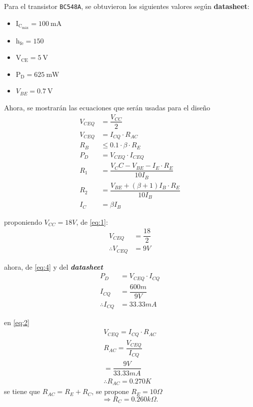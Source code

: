\documentclass[a4paper, 12pt]{article}
\begin{document}
Para el transistor \verb|BC548A|, se obtuvieron los siguientes valores según \textbf{datasheet}:
\begin{itemize}
    \item $\text{I}_{\text{C}_{\text{máx}}} = 100\ \text{mA}$
    \item $\text{h}_{\text{fe}} = 150$
    \item $\text{V}_{\text{CE}} = 5\ \text{V}$
    \item $\text{P}_\text{D} = 625\ \text{mW}$
    \item $V_{BE} = 0.7\ \text{V}$
\end{itemize}
Ahora, se mostrarán las ecuaciones que serán usadas para el diseño 
\begin{align}
    V_{CEQ} &= \dfrac{V_{CC}}{2} \label{eq:1}\\[1mm]
    V_{CEQ} &= I_{CQ}\cdot R_{AC} \label{eq:2}\\[1mm]
    R_B &\le 0.1\cdot \beta \cdot R_E \label{eq:3}\\[1.5mm]
    P_D &= V_{CEQ}\cdot I_{CEQ} \label{eq:4}\\[1.5mm]
    R_1 &= \dfrac{V_CC - V_{BE} -I_E\cdot R_E}{10I_B} \label{eq:5}\\[1.5mm]
    R_2 &= \dfrac{V_{BE} + (\beta + 1)I_B\cdot R_E}{10I_B}\label{eq:6}\\[1.5mm]
    I_C &= \beta I_B \label{eq:7}
\end{align}  

proponiendo $V_{CC} = 18 V$, de \eqref{eq:1}:
\begin{align*}
    V_{CEQ} &= \dfrac{18}{2} \\[1.5mm]
    \therefore V_{CEQ} &= 9 V
\end{align*}

ahora, de \eqref{eq:4} y del \textbf{\textit{datasheet}}
\begin{align*}
    P_D &= V_{CEQ}\cdot I_{CQ} \\[1mm]
    I_{CQ} &= \dfrac{600m}{9V} \\[1mm]
    \therefore I_{CQ} &= 33.33 mA 
\end{align*}

en \eqref{eq:2}
\begin{align*}
    V_{CEQ} = I_{CQ} \cdot R_{AC} \\[1mm]
    R_{AC} = \dfrac{V_{CEQ}}{I_{CQ}} \\ = \dfrac{9V}{33.33mA}\\[1.5mm]
    \therefore R_{AC} = 0.270K
\end{align*}
se tiene que $R_{AC} = R_E + R_C$, se propone $R_E = 10 \Omega$
$$ \Rightarrow R_C = 0.260 k\Omega.$$
\end{document}
